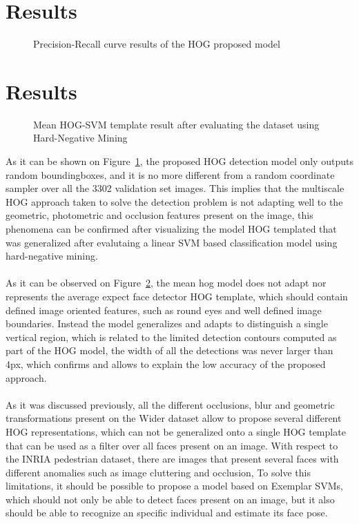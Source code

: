 \documentclass[10pt,twocolumn,letterpaper]{article}
\begin{document}
\section{Results}
\begin{figure}[H]
		\centering
		\caption{Precision-Recall curve results of the HOG proposed model}
		\label{Fig:PR}
\end{figure}


\section{Results}
\begin{figure}[H]
	\centering
	\caption{Mean HOG-SVM template result after evaluating the dataset using Hard-Negative Mining}
	\label{Fig:hog}
\end{figure}


As it can be shown on Figure~\ref{Fig:PR}, the proposed HOG detection model only outputs random boundingboxes, and it is no more different from a random coordinate sampler over all the 3302 validation set images. This implies that the multiscale HOG approach taken to solve the detection problem is not adapting well to the geometric, photometric and occlusion features present on the image, this phenomena can be confirmed after visualizing the model HOG templated that was generalized after evalutaing a linear SVM based classification model using hard-negative mining. 
\\
\\
As it can be observed on Figure~\ref{Fig:hog}, the mean hog model does not adapt nor represents the average expect face detector HOG template, which should contain defined image oriented features, such as round eyes and well defined image boundaries. Instead the model generalizes and adapts to distinguish a single vertical region, which is related to the limited detection contours computed as part of the HOG model, the width of all the detections was never larger than 4px, which confirms and allows to explain the low accuracy of the proposed approach.
\\
\\
As it was discussed previously, all the different occlusions, blur and geometric transformations present on the Wider dataset allow to propose several different HOG representations, which can not be generalized onto a single HOG template that can be used as a filter over all faces present on an image. With respect to the INRIA pedestrian dataset, there are images that present several faces with different anomalies such as image cluttering and occlusion, To solve this limitations, it should be possible to propose a model based on Exemplar SVMs, which should not only be able to detect faces present on an image, but it also should be able to recognize an specific individual and estimate its face pose.
\end{document}
